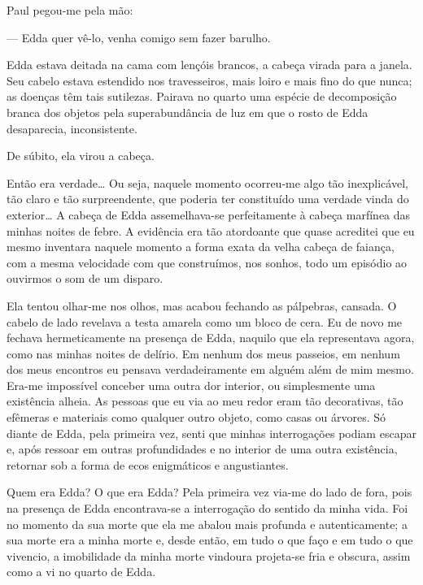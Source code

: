 Paul pegou-me pela mão:

--- Edda quer vê-lo, venha comigo sem fazer barulho.

Edda estava deitada na cama com lençóis brancos, a cabeça virada para a
janela. Seu cabelo estava estendido nos travesseiros, mais loiro e mais fino
do que nunca; as doenças têm tais sutilezas. Pairava no quarto uma espécie de
decomposição branca dos objetos pela superabundância de luz em que o rosto de
Edda desaparecia, inconsistente.

De súbito, ela virou a cabeça.

Então era verdade\ldots{} Ou seja, naquele momento ocorreu-me algo tão
inexplicável, tão claro e tão surpreendente, que poderia ter constituído uma
verdade vinda do exterior\ldots{} A cabeça de Edda assemelhava-se
perfeitamente à cabeça marfínea das minhas noites de febre. A evidência era
tão atordoante que quase acreditei que eu mesmo inventara naquele momento a
forma exata da velha cabeça de faiança, com a mesma velocidade com que
construímos, nos sonhos, todo um episódio ao ouvirmos o som de um disparo.  


Ela tentou olhar-me nos olhos, mas acabou fechando as pálpebras, cansada. O
cabelo de lado revelava a testa amarela como um bloco de cera. Eu de novo me
fechava hermeticamente na presença de Edda, naquilo que ela representava
agora, como nas minhas noites de delírio. Em nenhum dos meus passeios, em
nenhum dos meus encontros eu pensava verdadeiramente em alguém além de mim
mesmo. Era-me impossível conceber uma outra dor interior, ou simplesmente uma
existência alheia. As pessoas que eu via ao meu redor eram tão decorativas,
tão efêmeras e materiais como qualquer outro objeto, como casas ou árvores.
Só diante de Edda, pela primeira vez, senti que minhas interrogações podiam
escapar e, após ressoar em outras profundidades e no interior de uma outra
existência, retornar sob a forma de ecos enigmáticos e angustiantes.

Quem era Edda? O que era Edda? Pela primeira vez via-me do lado de fora, pois
na presença de Edda encontrava-se a interrogação do sentido da minha vida.
Foi no momento da sua morte que ela me abalou mais profunda e autenticamente;
a sua morte era a minha morte e, desde então, em tudo o que faço e em tudo o
que vivencio, a imobilidade da minha morte vindoura projeta-se fria e
obscura, assim como a vi no quarto de Edda.


